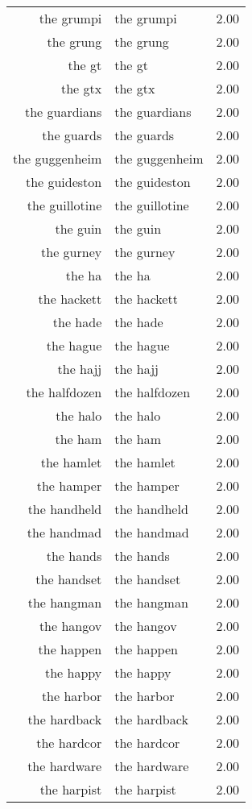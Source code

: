 \begin{table}[ht]
\begin{tabular}{rlr}
  the grumpi & the grumpi & 2.00 \\ 
  the grung & the grung & 2.00 \\ 
  the gt & the gt & 2.00 \\ 
  the gtx & the gtx & 2.00 \\ 
  the guardians & the guardians & 2.00 \\ 
  the guards & the guards & 2.00 \\ 
  the guggenheim & the guggenheim & 2.00 \\ 
  the guideston & the guideston & 2.00 \\ 
  the guillotine & the guillotine & 2.00 \\ 
  the guin & the guin & 2.00 \\ 
  the gurney & the gurney & 2.00 \\ 
  the ha & the ha & 2.00 \\ 
  the hackett & the hackett & 2.00 \\ 
  the hade & the hade & 2.00 \\ 
  the hague & the hague & 2.00 \\ 
  the hajj & the hajj & 2.00 \\ 
  the halfdozen & the halfdozen & 2.00 \\ 
  the halo & the halo & 2.00 \\ 
  the ham & the ham & 2.00 \\ 
  the hamlet & the hamlet & 2.00 \\ 
  the hamper & the hamper & 2.00 \\ 
  the handheld & the handheld & 2.00 \\ 
  the handmad & the handmad & 2.00 \\ 
  the hands & the hands & 2.00 \\ 
  the handset & the handset & 2.00 \\ 
  the hangman & the hangman & 2.00 \\ 
  the hangov & the hangov & 2.00 \\ 
  the happen & the happen & 2.00 \\ 
  the happy & the happy & 2.00 \\ 
  the harbor & the harbor & 2.00 \\ 
  the hardback & the hardback & 2.00 \\ 
  the hardcor & the hardcor & 2.00 \\ 
  the hardware & the hardware & 2.00 \\ 
  the harpist & the harpist & 2.00 \\ 

\end{tabular}
\end{table}

